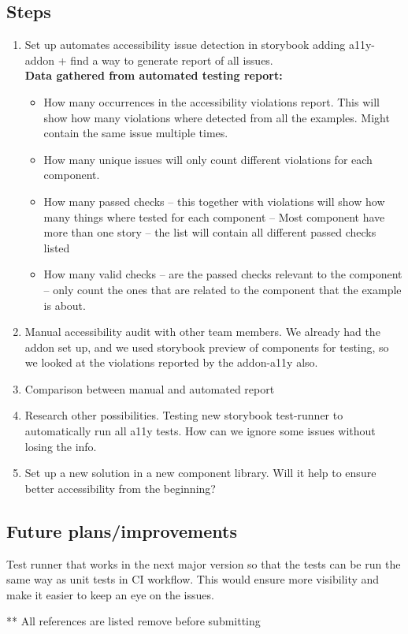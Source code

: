 \documentclass{master_thesis}
\begin{document}
\subsection{Steps}
\begin{enumerate}
	\item Set up automates accessibility issue detection in storybook
	adding a11y-addon + find a way to generate report of all issues. \\
	\textbf{Data gathered from automated testing report:}
	\begin{itemize}
		\item How many occurrences in the accessibility violations report. This will show how many violations where detected from all the examples. Might contain the same issue multiple times.
		\item How many unique issues will only count different violations for each component.
		\item How many passed checks – this together with violations will show how many things where tested for each component – Most component have more than one story – the list will contain all different passed checks listed
		\item How many valid checks – are the passed checks relevant to the component – only count the ones that are related to the component that the example is about.
	\end{itemize}
	\item Manual accessibility audit with other team members. We already had the addon set up, and we used storybook preview of components for testing, so we looked at the violations reported by the addon-a11y also.
	\item Comparison between manual and automated report
	\item Research other possibilities. Testing new storybook test-runner to automatically run all a11y tests. How can we ignore some issues without losing the info.
	\item Set up a new solution in a new component library. Will it help to ensure better accessibility from the beginning?
\end{enumerate}

\subsection{Future plans/improvements}
Test runner that works in the next major version so that the tests can be run the same way as unit tests in CI workflow. This would ensure more visibility and make it easier to keep an eye on the issues.

\pagebreak
** All references are listed remove before submitting
\printbibliography
\end{document}
